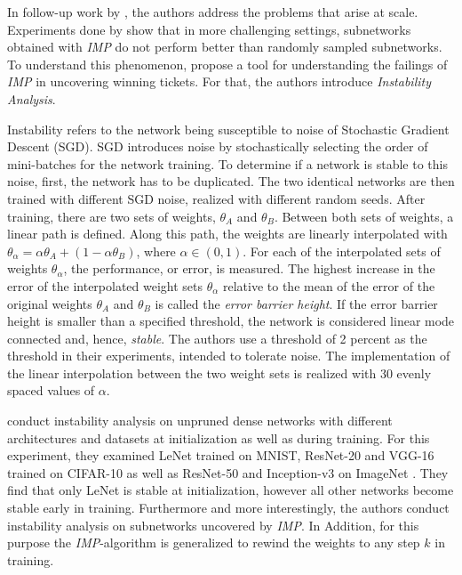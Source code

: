In follow-up work by \textcite{LinearModeConnectivity}, the authors address the problems that arise at scale.
Experiments done by \textcite{Liu19, Gale19} show that in more challenging settings, subnetworks obtained with \textit{IMP} do not perform better than randomly sampled subnetworks.
To understand this phenomenon, \textcite{LinearModeConnectivity} propose a tool for understanding the failings of \textit{IMP} in uncovering winning tickets.
For that, the authors introduce \textit{Instability Analysis}.

Instability refers to the network being susceptible to noise of Stochastic Gradient Descent (SGD).
SGD introduces noise by stochastically selecting the order of mini-batches for the network training.
To determine if a network is stable to this noise, first, the network has to be duplicated.
The two identical networks are then trained with different SGD noise, realized with different random seeds.
After training, there are two sets of weights, $\theta_A$ and $\theta_B$.
Between both sets of weights, a linear path is defined.
Along this path, the weights are linearly interpolated with $\theta_\alpha = \alpha \theta_A + (1 - \alpha \theta_B)$, where $\alpha \in (0,1)$. 
For each of the interpolated sets of weights $\theta_\alpha$, the performance, or error, is measured.
The highest increase in the error of the interpolated weight sets $\theta_\alpha$ relative to the mean of the error of the original weights $\theta_A$ and $\theta_B$ is called the \textit{error barrier height}. 
If the error barrier height is smaller than a specified threshold, the network is considered linear mode connected and, hence, \textit{stable}.
The authors use a threshold of 2 percent as the threshold in their experiments, intended to tolerate noise. 
The implementation of the linear interpolation between the two weight sets is realized with 30 evenly spaced values of $\alpha$.

\textcite{LinearModeConnectivity} conduct instability analysis on unpruned dense networks with different architectures and datasets at initialization as well as during training.
For this experiment, they examined LeNet trained on MNIST, ResNet-20 and VGG-16 trained on CIFAR-10 as well as ResNet-50 and Inception-v3 \autocite{inceptionv3} on ImageNet \autocite{imagenet}. 
They find that only LeNet is stable at initialization, however all other networks become stable early in training.
Furthermore and more interestingly, the authors conduct instability analysis on subnetworks uncovered by \textit{IMP}.
In Addition, for this purpose the \textit{IMP}-algorithm is generalized to rewind the weights to any step $k$ in training.

